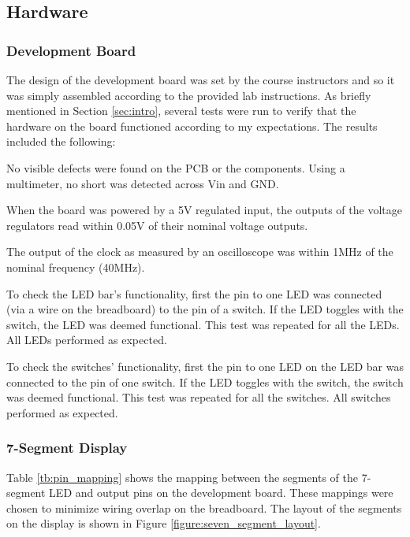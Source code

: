 \documentclass[11pt]{article}
\begin{document}
\subsection{Hardware}

\subsubsection{Development Board}

The design of the development board was set by the course instructors and so it was simply assembled according to the provided lab instructions. As briefly mentioned in Section \ref{sec:intro}, several tests were run to verify that the hardware on the board functioned according to my expectations. The results included the following:

	\begin{description} \itemsep0pt
		\item[Pre-assembly Inspection ] No visible defects were found on the PCB or the components. Using a multimeter, no short was detected across Vin and GND.
		\item[Power Supply ] When the board was powered by a 5V regulated input, the outputs of the voltage regulators read within 0.05V of their nominal voltage outputs. 
		\item[Clock ] The output of the clock as measured by an oscilloscope was within 1MHz of the nominal frequency (40MHz).
		\item[LED Bar ] To check the LED bar's functionality, first the pin to one LED was connected (via a wire on the breadboard) to the pin of a switch. If the LED toggles with the switch, the LED was deemed functional. This test was repeated for all the LEDs. All LEDs performed as expected.
		\item[Switches ] To check the switches' functionality, first the pin to one LED on the LED bar was connected to the pin of one switch. If the LED toggles with the switch, the switch was deemed functional. This test was repeated for all the switches. All switches performed as expected.
		
		
	\end{description}


\subsubsection{7-Segment Display}


 Table \ref{tb:pin_mapping} shows the mapping between the segments of the 7-segment LED and output pins on the development board. These mappings were chosen to minimize wiring overlap on the breadboard. The layout of the segments on the display is shown in Figure \ref{figure:seven_segment_layout}.
\end{document}
